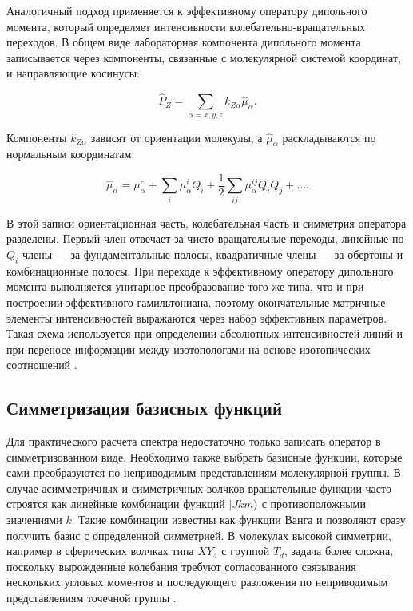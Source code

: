Аналогичный подход применяется к эффективному оператору дипольного момента,
который определяет интенсивности колебательно-вращательных переходов. В
общем виде лабораторная компонента дипольного момента записывается через
компоненты, связанные с молекулярной системой координат, и направляющие
косинусы:

\begin{equation}
\hat{P}_Z=\sum_{\alpha=x,y,z}k_{Z\alpha}\hat{\mu}_{\alpha}.
\end{equation}

Компоненты $k_{Z\alpha}$ зависят от ориентации молекулы, а
$\hat{\mu}_{\alpha}$ раскладываются по нормальным координатам:

\begin{equation}
\hat{\mu}_{\alpha}=\mu^e_{\alpha}+
\sum_i\mu^i_{\alpha}Q_i+
\frac{1}{2}\sum_{ij}\mu^{ij}_{\alpha}Q_iQ_j+\ldots .
\end{equation}

В этой записи ориентационная часть, колебательная часть и симметрия
оператора разделены. Первый член отвечает за чисто вращательные переходы,
линейные по $Q_i$ члены --- за фундаментальные полосы, квадратичные члены ---
за обертоны и комбинационные полосы. При переходе к эффективному оператору
дипольного момента выполняется унитарное преобразование того же типа, что и
при построении эффективного гамильтониана, поэтому окончательные матричные
элементы интенсивностей выражаются через набор эффективных параметров.
Такая схема используется при определении абсолютных интенсивностей линий и
при переносе информации между изотопологами на основе изотопических
соотношений \cite{Ulenikov2019a,Ulenikov2020a}.

\subsection{Симметризация базисных функций}

Для практического расчета спектра недостаточно только записать оператор в
симметризованном виде. Необходимо также выбрать базисные функции, которые
сами преобразуются по неприводимым представлениям молекулярной группы. В
случае асимметричных и симметричных волчков вращательные функции часто
строятся как линейные комбинации функций $|Jkm\rangle$ с противоположными
значениями $k$. Такие комбинации известны как функции Ванга и позволяют
сразу получить базис с определенной симметрией. В молекулах высокой
симметрии, например в сферических волчках типа $XY_4$ с группой $T_d$,
задача более сложна, поскольку вырожденные колебания требуют согласованного
связывания нескольких угловых моментов и последующего разложения по
неприводимым представлениям точечной группы \cite{hecht}.


